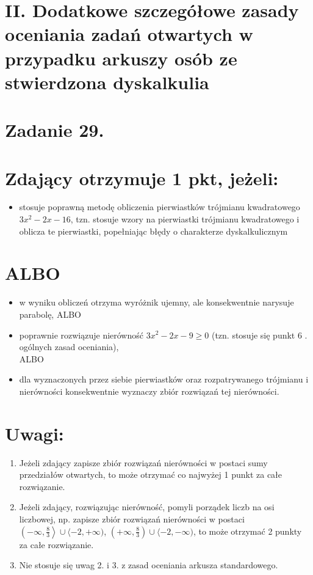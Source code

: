 \documentclass[10pt]{article}
\begin{document}
\section*{II. Dodatkowe szczegółowe zasady oceniania zadań otwartych w przypadku arkuszy osób ze stwierdzona dyskalkulia}
\section*{Zadanie 29.}
\section*{Zdający otrzymuje 1 pkt, jeżeli:}
\begin{itemize}
  \item stosuje poprawną metodę obliczenia pierwiastków trójmianu kwadratowego $3 x^{2}-2 x-16$, tzn. stosuje wzory na pierwiastki trójmianu kwadratowego i oblicza te pierwiastki, popełniając błędy o charakterze dyskalkulicznym
\end{itemize}

\section*{ALBO}
\begin{itemize}
  \item w wyniku obliczeń otrzyma wyróżnik ujemny, ale konsekwentnie narysuje parabolę, ALBO
  \item poprawnie rozwiązuje nierówność $3 x^{2}-2 x-9 \geq 0$ (tzn. stosuje się punkt 6 . ogólnych zasad oceniania),\\
ALBO
  \item dla wyznaczonych przez siebie pierwiastków oraz rozpatrywanego trójmianu i nierówności konsekwentnie wyznaczy zbiór rozwiązań tej nierówności.
\end{itemize}

\section*{Uwagi:}
\begin{enumerate}
  \item Jeżeli zdający zapisze zbiór rozwiązań nierówności w postaci sumy przedziałów otwartych, to może otrzymać co najwyżej 1 punkt za całe rozwiązanie.
  \item Jeżeli zdający, rozwiązując nierówność, pomyli porządek liczb na osi liczbowej, np. zapisze zbiór rozwiązań nierówności w postaci $\left(-\infty, \frac{8}{3}\right\rangle \cup\langle-2,+\infty)$, $\left(+\infty, \frac{8}{3}\right) \cup\langle-2,-\infty)$, to może otrzymać 2 punkty za całe rozwiązanie.
  \item Nie stosuje się uwag 2. i 3. z zasad oceniania arkusza standardowego.
\end{enumerate}
\end{document}
